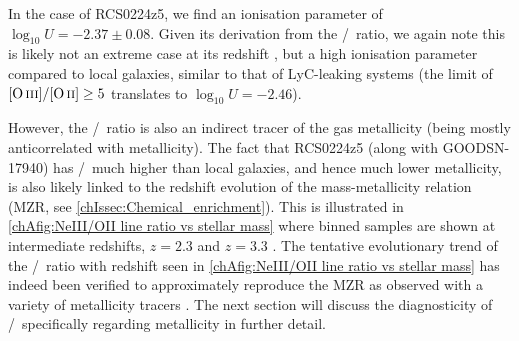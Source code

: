 \noindent In the case of RCS0224z5, we find an ionisation parameter of $\log_{10} U = -2.37 \pm 0.08$. Given its derivation from the \NeIII/\OII\ ratio, we again note this is likely not an extreme case at its redshift \citep[\cref{chAfig:NeIII/OII line ratio vs stellar mass}, and see similar estimates of $U$ at $z \sim 7$-$8$ in][]{2017MNRAS.464..469S}, but a high ionisation parameter compared to local galaxies, similar to that of LyC-leaking systems (the limit of $\OIIIf/\OII \geq 5$ translates to $\log_{10} U = -2.46$).

However, the \NeIII/\OII\ ratio is also an indirect tracer of the gas metallicity (being mostly anticorrelated with metallicity). The fact that RCS0224z5 (along with GOODSN-17940) has \NeIII/\OII\ much higher than local galaxies, and hence much lower metallicity, is also likely linked to the redshift evolution of the mass-metallicity relation (MZR, see \cref{chIssec:Chemical_enrichment}). This is illustrated in \cref{chAfig:NeIII/OII line ratio vs stellar mass} where binned samples are shown at intermediate redshifts, $z = 2.3$ and $z = 3.3$ \citep[measurements from MOSDEF the MOSFIRE Deep Evolution Field survey;][]{2021ApJ...914...19S}. The tentative evolutionary trend of the \NeIII/\OII\ ratio with redshift seen in \cref{chAfig:NeIII/OII line ratio vs stellar mass} has indeed been verified to approximately reproduce the MZR as observed with a variety of metallicity tracers \citep[e.g.][]{2008A&A...488..463M}. The next section will discuss the diagnosticity of \NeIII/\OII\ specifically regarding metallicity in further detail.
